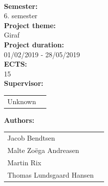 \newpage
\makeatother
\begin{minipage}[T]{0.45\textwidth}
 \begin{flushleft}
  \textbf{\normalsize{}}\\ \maketitle
  \textbf{\normalsize{Semester:}}\\6. semester\\
  \textbf{\normalsize{Project theme:}}\\Giraf\\
  \textbf{\normalsize{Project duration:}}\\01/02/2019 - 28/05/2019\\
  \textbf{\normalsize{ECTS:}}\\15\\
  \textbf{\normalsize{Supervisor:}}\\
  \begin{tabular}{ll}
    \normalsize{Unknown}\\
  \end{tabular}

  \textbf{\normalsize{Authors:}}\\
  \begin{tabular}{ll}
   \normalsize{Jacob Bendtsen}\\
   \normalsize{Malte Zoëga Andreasen}\\
   \normalsize{Martin Rix}\\
   \normalsize{Thomas Lundsgaard Hansen}\\
  \end{tabular}
 \end{flushleft}
\end{minipage}
 ~

